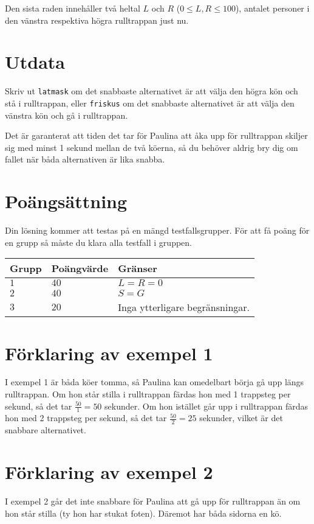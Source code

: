 Den sista raden innehåller två heltal $L$ och $R$ ($0 \le L, R \le 100$), antalet personer i den vänstra respektiva högra rulltrappan just nu.

\section*{Utdata}
Skriv ut \texttt{latmask} om det snabbaste alternativet är att välja den högra kön och stå i rulltrappan, eller \texttt{friskus} om det snabbaste alternativet är att välja den vänstra kön och gå i rulltrappan.

Det är garanterat att tiden det tar för Paulina att åka upp för rulltrappan skiljer sig med minst 1 sekund mellan de två köerna, så du behöver aldrig bry dig om fallet när båda alternativen är lika snabba.

\section*{Poängsättning}
Din lösning kommer att testas på en mängd testfallsgrupper.
För att få poäng för en grupp så måste du klara alla testfall i gruppen.

\noindent
\begin{tabular}{| l | l | p{12cm} |}
  \hline
  Grupp & Poängvärde & Gränser \\ \hline
    $1$   & $40$     & $L = R = 0$ \\ \hline
    $2$   & $40$     & $S = G$ \\ \hline
    $3$   & $20$     & Inga ytterligare begränsningar. \\ \hline
\end{tabular}


\section*{Förklaring av exempel 1}
I exempel 1 är båda köer tomma, så Paulina kan omedelbart börja gå upp längs rulltrappan.
Om hon står stilla i rulltrappan färdas hon med 1 trappsteg per sekund, så det tar $\frac{50}{1} = 50$ sekunder.
Om hon istället går upp i rulltrappan färdas hon med 2 trappsteg per sekund, så det tar $\frac{50}{2} = 25$ sekunder, vilket är det snabbare alternativet.

\section*{Förklaring av exempel 2}
I exempel 2 går det inte snabbare för Paulina att gå upp för rulltrappan än om hon står stilla (ty hon har stukat foten).
Däremot har båda sidorna en kö.

